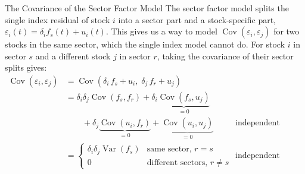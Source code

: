 \documentclass[aspectratio=169,11pt]{beamer}
\begin{document}
\begin{frame}{The Covariance of the Sector Factor Model}
  The sector factor model splits the single index residual of stock $i$ into a sector part and a
  stock-specific part, $\varepsilon_i(t)=\delta_i f_s(t)+u_i(t)$. This gives us a way to model
  $\operatorname{Cov}(\varepsilon_i,\varepsilon_j)$ for two stocks in the same sector, which the single
  index model cannot do. For stock $i$ in sector $s$ and a different stock $j$ in sector $r$,
  taking the covariance of their sector splits gives:
  {\small\begin{align*}
    \operatorname{Cov}(\varepsilon_{i},\varepsilon_{j}) &= \operatorname{Cov}\left(\delta_{i}\,f_{s}+u_{i},\;\delta_{j}\,f_{r}+u_{j}\right)\\
    &= \delta_{i}\delta_{j}\operatorname{Cov}(f_{s},f_{r})+\delta_{i}\underbrace{\operatorname{Cov}(f_{s},u_{j})}_{=0}\\
    &\qquad+\delta_{j}\underbrace{\operatorname{Cov}(u_{i},f_{r})}_{=0}+\underbrace{\operatorname{Cov}(u_{i},u_{j})}_{=0} && \text{independent draws}\\
    &= \begin{cases}\delta_{i}\delta_{j}\operatorname{Var}(f_{s}) & \text{same sector, } r=s\\ 0 & \text{different sectors, } r\neq s\end{cases} && \text{independent sector draws}
  \end{align*}}%
\end{frame}
\end{document}
